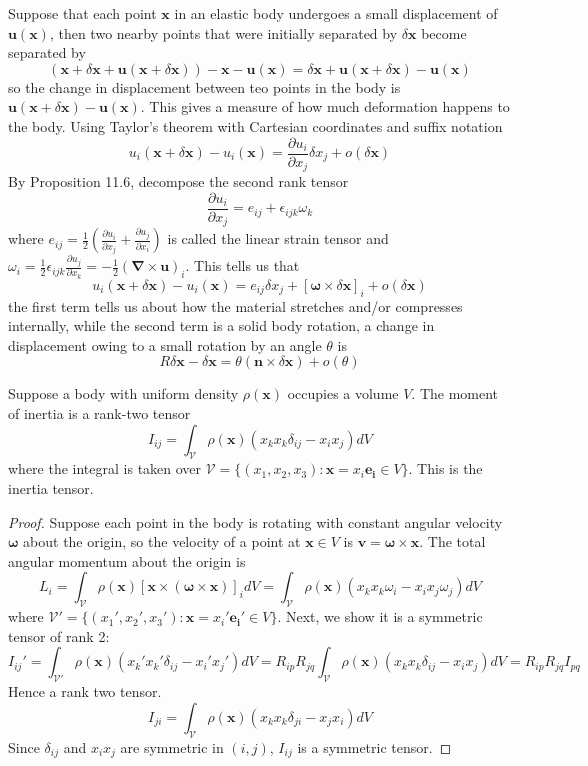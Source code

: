 \documentclass[a4paper]{article}
\begin{document}
\begin{eg}
Suppose that each point $\mathbf{x}$ in an elastic body undergoes a small displacement of $\mathbf{u}(\mathbf{x})$, then two nearby points that were initially separated by $\delta\mathbf{x}$ become separated by
$$(\mathbf{x}+\delta\mathbf{x}+\mathbf{u}(\mathbf{x}+\delta\mathbf{x}))-\mathbf{x}-\mathbf{u}(\mathbf{x})=\delta\mathbf{x}+\mathbf{u}(\mathbf{x}+\delta\mathbf{x})-\mathbf{u}(\mathbf{x})$$
so the change in displacement between teo points in the body is $\mathbf{u}(\mathbf{x}+\delta\mathbf{x})-\mathbf{u}(\mathbf{x})$. This gives a measure of how much deformation happens to the body. Using Taylor's theorem with Cartesian coordinates and suffix notation
$$u_i(\mathbf{x}+\delta\mathbf{x})-u_i(\mathbf{x})=\frac{\partial u_i}{\partial x_j}\delta x_j+o(\delta\mathbf{x})$$
By Proposition 11.6, decompose the second rank tensor 
$$\frac{\partial u_i}{\partial x_j}=e_{ij}+\epsilon_{ijk}\omega_k$$
where $e_{ij}=\frac{1}{2}(\frac{\partial u_i}{\partial x_j}+\frac{\partial u_j}{\partial x_i})$ is called the linear strain tensor and $\omega_i=\frac{1}{2}\epsilon_{ijk}\frac{\partial u_j}{\partial x_k}=-\frac{1}{2}(\boldsymbol{\nabla}\times\mathbf{u})_i$. This tells us that
$$u_i(\mathbf{x}+\delta\mathbf{x})-u_i(\mathbf{x})=e_{ij}\delta x_j+[\boldsymbol{\omega}\times\delta\mathbf{x}]_i+o(\delta\mathbf{x})$$
the first term tells us about how the material stretches and/or compresses internally, while the second term is a solid body rotation, a change in displacement owing to a small rotation by an angle $\theta$ is
$$R\delta\mathbf{x}-\delta\mathbf{x}=\theta(\mathbf{n}\times\delta\mathbf{x})+o(\theta)$$
\end{eg}
\begin{prop}
Suppose a body with uniform density $\rho(\mathbf{x})$ occupies a volume $V$. The moment of inertia is a rank-two tensor
$$I_{ij}=\int_{\mathcal{V}}\rho(\mathbf{x})(x_kx_k\delta_{ij}-x_ix_j)dV$$
where the integral is taken over $\mathcal{V}=\{(x_1,x_2,x_3):\mathbf{x}=x_i\mathbf{e_i}\in V\}$. This is the inertia tensor.
\end{prop}
\begin{proof}
Suppose each point in the body is rotating with constant angular velocity $\boldsymbol{\omega}$ about the origin, so the velocity of a point at $\mathbf{x}\in V$ is $\mathbf{v}=\boldsymbol{\omega}\times\mathbf{x}$. The total angular momentum about the origin is
$$L_i=\int_{\mathcal{V}}\rho(\mathbf{x})[\mathbf{x}\times(\boldsymbol{\omega}\times\mathbf{x})]_idV=\int_{\mathcal{V}}\rho(\mathbf{x})(x_kx_k\omega_i-x_ix_j\omega_j)dV$$
where $\mathcal{V}'=\{(x_1',x_2',x_3'):\mathbf{x}=x_i'\mathbf{e_i'}\in V\}$. Next, we show it is a symmetric tensor of rank 2:
$$I_{ij}'=\int_{\mathcal{V}'}\rho(\mathbf{x})(x_k'x_k'\delta_{ij}-x_i'x_j')dV=R_{ip}R_{jq}\int_{\mathcal{V}}\rho(\mathbf{x})(x_kx_k\delta_{ij}-x_ix_j)dV=R_{ip}R_{jq}I_{pq}$$
Hence a rank two tensor.
$$I_{ji}=\int_{\mathcal{V}}\rho(\mathbf{x})(x_kx_k\delta_{ji}-x_jx_i)dV$$
Since $\delta_{ij}$ and $x_ix_j$ are symmetric in $(i,j)$, $I_{ij}$ is a symmetric tensor.
\end{proof}
\end{document}
